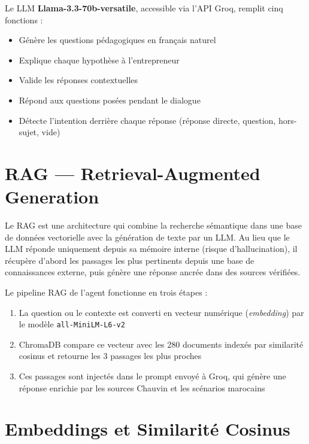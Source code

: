 \documentclass[12pt, a4paper]{report}
\begin{document}
\begin{formulebox}[title={\bfseries\color{navyblue} Rôle du LLM dans l'Agent Hypothèses}]
Le LLM \textbf{Llama-3.3-70b-versatile}, accessible via l'API Groq, remplit cinq fonctions :
\begin{itemize}
  \item Génère les questions pédagogiques en français naturel
  \item Explique chaque hypothèse à l'entrepreneur
  \item Valide les réponses contextuelles
  \item Répond aux questions posées pendant le dialogue
  \item Détecte l'intention derrière chaque réponse (réponse directe, question, hors-sujet, vide)
\end{itemize}
\end{formulebox}

\section{RAG — Retrieval-Augmented Generation}

Le RAG est une architecture qui combine la recherche sémantique dans une base de données vectorielle avec la génération de texte par un LLM. Au lieu que le LLM réponde uniquement depuis sa mémoire interne (risque d'hallucination), il récupère d'abord les passages les plus pertinents depuis une base de connaissances externe, puis génère une réponse ancrée dans des sources vérifiées.

Le pipeline RAG de l'agent fonctionne en trois étapes :

\begin{enumerate}
  \item La question ou le contexte est converti en vecteur numérique (\textit{embedding}) par le modèle \texttt{all-MiniLM-L6-v2}
  \item ChromaDB compare ce vecteur avec les 280 documents indexés par similarité cosinus et retourne les 3 passages les plus proches
  \item Ces passages sont injectés dans le prompt envoyé à Groq, qui génère une réponse enrichie par les sources Chauvin et les scénarios marocains
\end{enumerate}

\section{Embeddings et Similarité Cosinus}
\end{document}

